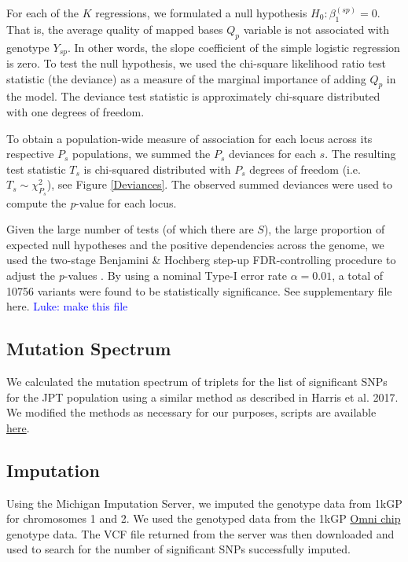 \documentclass[9pt,lineno]{elife}
\newcommand{\luke}[1]{\textcolor{blue}{Luke: #1}}
\begin{document}
For each of the $K$ regressions, we formulated a null hypothesis $H_{0}: \beta_{1}^{(sp)}=0$. That is, the average quality of mapped bases $Q_{p}$ variable is not associated with genotype $Y_{sp}$.
In other words, the slope coefficient of the simple logistic regression is zero.
To test the null hypothesis, we used the chi-square likelihood ratio test statistic (the deviance) as a measure of the marginal importance of adding $Q_{p}$ in the model. 
The deviance test statistic is approximately chi-square distributed with one degrees of freedom.  

To obtain a population-wide measure of association for each locus across its respective $P_s$ populations, we summed the $P_s$ deviances for each $s$. The resulting test statistic $T_s$ is chi-squared distributed with $P_s$ degrees of freedom (i.e. $T_s \sim \chi^2_{P_s}$), see Figure \ref{Deviances}.
The observed summed deviances were used to compute the \textit{p}-value for each locus.


Given the large number of tests (of which there are $S$), the large proportion of expected null hypotheses and the positive dependencies across the genome, we used the two-stage Benjamini \& Hochberg step-up FDR-controlling procedure to adjust the \textit{p}-values \citep{Benjamini2006}.
By using a nominal Type-I error rate $\alpha = 0.01$, a total of 10756 variants were found to be statistically significance. See supplementary file {here}. \luke{make this file}

\subsection{Mutation Spectrum}
We calculated the mutation spectrum of triplets for the list of significant SNPs for the JPT population using a similar method as described in Harris et al. 2017. \citep{Harris2017a}
We modified the methods as necessary for our purposes, scripts are available \href{https://github.com/LukeAndersonTrocme/QualityPaper}{here}. 

\subsection{Imputation}
Using the Michigan Imputation Server, we imputed the genotype data from 1kGP for chromosomes 1 and 2.
We used the genotyped data from the 1kGP \href{ftp://ftp.1000genomes.ebi.ac.uk/vol1/ftp/release/20130502/supporting/hd_genotype_chip/ALL.chip.omni_broad_sanger_combined.20140818.snps.genotypes.vcf.gz}{Omni chip} genotype data.
The VCF file returned from the server was then downloaded and used to search for the number of significant SNPs successfully imputed. 
\end{document}
